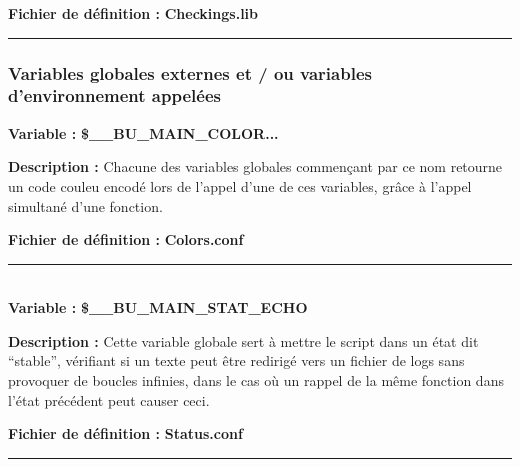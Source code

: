 \documentclass[a4paper,10pt]{article}
\begin{document}
\textbf{Fichier de définition :} \textbf{\color{lime}Checkings.lib\color{white}}\\[1\baselineskip]



\color{blue}\par\noindent\rule{\textwidth}{0.4pt}\color{white}

\color{blue}
\subsubsection{Variables globales externes et / ou variables d'environnement appelées}\color{white}

\textbf{Variable :} \textbf{\color{orange}\$\_\_BU\_MAIN\_COLOR...\color{white}}\\[1\baselineskip]

\begin{justify}
    \textbf{Description :} Chacune des variables globales commençant par ce nom retourne un code couleu encodé lors de l'appel d'une de ces variables, grâce à l'appel simultané d'une fonction.
\end{justify}

\textbf{Fichier de définition :} \textbf{\color{lime}Colors.conf\color{white}}\\[1\baselineskip]



\color{orange}\par\noindent\rule{\textwidth}{0.4pt}\color{white}\\[1\baselineskip]

\textbf{Variable :} \textbf{\color{orange}\$\_\_BU\_MAIN\_STAT\_ECHO\color{white}}\\[1\baselineskip]

\begin{justify}
    \textbf{Description :} Cette variable globale sert à mettre le script dans un état dit ``stable'', vérifiant si un texte peut être redirigé vers un fichier de logs sans provoquer de boucles infinies, dans le cas où un rappel de la même fonction dans l'état précédent peut causer ceci.
\end{justify}

\textbf{Fichier de définition :} \textbf{\color{lime}Status.conf\color{white}}\\[1\baselineskip]



\color{orange}\par\noindent\rule{\textwidth}{0.4pt}\color{white}\\[1\baselineskip]
\end{document}
